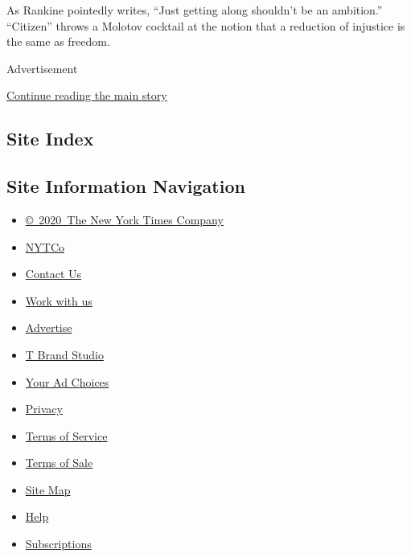 As Rankine pointedly writes, ``Just getting along shouldn't be an
ambition.'' ``Citizen'' throws a Molotov cocktail at the notion that a
reduction of injustice is the same as freedom.

Advertisement

\protect\hyperlink{after-bottom}{Continue reading the main story}

\hypertarget{site-index}{%
\subsection{Site Index}\label{site-index}}

\hypertarget{site-information-navigation}{%
\subsection{Site Information
Navigation}\label{site-information-navigation}}

\begin{itemize}
\tightlist
\item
  \href{https://help.nytimes3xbfgragh.onion/hc/en-us/articles/115014792127-Copyright-notice}{©~2020~The
  New York Times Company}
\end{itemize}

\begin{itemize}
\tightlist
\item
  \href{https://www.nytco.com/}{NYTCo}
\item
  \href{https://help.nytimes3xbfgragh.onion/hc/en-us/articles/115015385887-Contact-Us}{Contact
  Us}
\item
  \href{https://www.nytco.com/careers/}{Work with us}
\item
  \href{https://nytmediakit.com/}{Advertise}
\item
  \href{http://www.tbrandstudio.com/}{T Brand Studio}
\item
  \href{https://www.nytimes3xbfgragh.onion/privacy/cookie-policy\#how-do-i-manage-trackers}{Your
  Ad Choices}
\item
  \href{https://www.nytimes3xbfgragh.onion/privacy}{Privacy}
\item
  \href{https://help.nytimes3xbfgragh.onion/hc/en-us/articles/115014893428-Terms-of-service}{Terms
  of Service}
\item
  \href{https://help.nytimes3xbfgragh.onion/hc/en-us/articles/115014893968-Terms-of-sale}{Terms
  of Sale}
\item
  \href{https://spiderbites.nytimes3xbfgragh.onion}{Site Map}
\item
  \href{https://help.nytimes3xbfgragh.onion/hc/en-us}{Help}
\item
  \href{https://www.nytimes3xbfgragh.onion/subscription?campaignId=37WXW}{Subscriptions}
\end{itemize}
